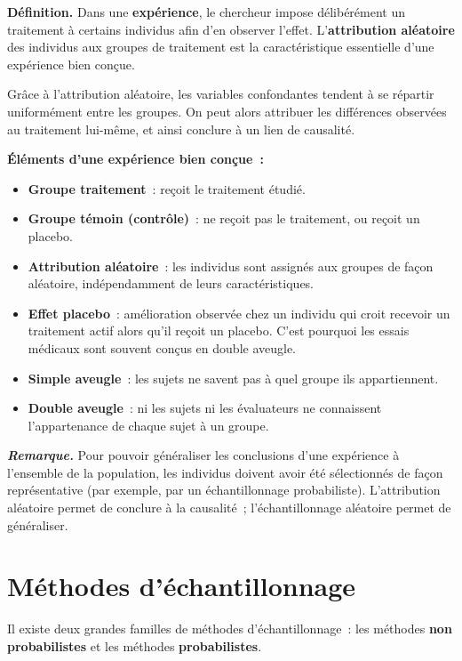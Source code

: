 \documentclass[11pt,french]{article}
\newcommand{\remarque}[1]{%
  \medskip\noindent\textit{\textbf{Remarque.}} #1\medskip}
\begin{document}
\textbf{Définition.} Dans une \textbf{expérience}, le chercheur impose délibérément un
traitement à certains individus afin d'en observer l'effet. L'\textbf{attribution aléatoire}
des individus aux groupes de traitement est la caractéristique essentielle d'une expérience
bien conçue.

Grâce à l'attribution aléatoire, les variables confondantes tendent à se répartir
uniformément entre les groupes. On peut alors attribuer les différences observées au
traitement lui-même, et ainsi conclure à un lien de causalité.

\textbf{Éléments d'une expérience bien conçue~:}
\begin{itemize}[itemsep=2pt]
  \item \textbf{Groupe traitement}~: reçoit le traitement étudié.
  \item \textbf{Groupe témoin (contrôle)}~: ne reçoit pas le traitement, ou reçoit un placebo.
  \item \textbf{Attribution aléatoire}~: les individus sont assignés aux groupes de façon
        aléatoire, indépendamment de leurs caractéristiques.
  \item \textbf{Effet placebo}~: amélioration observée chez un individu qui croit recevoir un
        traitement actif alors qu'il reçoit un placebo. C'est pourquoi les essais médicaux sont
        souvent conçus en double aveugle.
  \item \textbf{Simple aveugle}~: les sujets ne savent pas à quel groupe ils appartiennent.
  \item \textbf{Double aveugle}~: ni les sujets ni les évaluateurs ne connaissent l'appartenance
        de chaque sujet à un groupe.
\end{itemize}

\remarque{Pour pouvoir généraliser les conclusions d'une expérience à l'ensemble de la
population, les individus doivent avoir été sélectionnés de façon représentative (par exemple,
par un échantillonnage probabiliste). L'attribution aléatoire permet de conclure à la
causalité~; l'échantillonnage aléatoire permet de généraliser.}

\section{Méthodes d'échantillonnage}

Il existe deux grandes familles de méthodes d'échantillonnage~: les méthodes
\textbf{non probabilistes} et les méthodes \textbf{probabilistes}.
\end{document}
